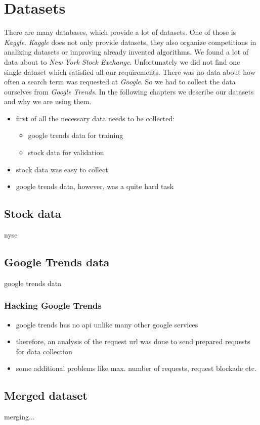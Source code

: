 \section{Datasets}
\label{sec:datasets}
There are many databases, which provide a lot of datasets. One of those is \textit{Kaggle}. \textit{Kaggle} does not only provide datasets, they also organize competitions in analizing datasets or improving already invented algorithms. We found a lot of data about to \textit{New York Stock Exchange}. Unfortunately we did not find one single dataset which satisfied all our requirements. There was no data about how often a search term was requested at \textit{Google}. So we had to collect the data ourselves from \textit{Google Trends}. In the following chapters we describe our datasets and why we are using them.

\begin{itemize}
	\item{first of all the necessary data needs to be collected: \\
		\begin{itemize}
			\item google trends data for training
			\item stock data for validation
		\end{itemize}
	}
	\item stock data was easy to collect
	\item google trends data, however, was a quite hard task
\end{itemize}

\subsection{Stock data}
\label{subsec:stockdata}
nyse


\subsection{Google Trends data}
\label{subsec:gtdata}
google trends data

\subsubsection{Hacking Google Trends}
\label{subsub:hackinggt}
\begin{itemize}
	\item google trends has no api unlike many other google services
	\item therefore, an analysis of the request url was done to send prepared requests for data collection
	\item some additional problems like max. number of requests, request blockade etc.
\end{itemize}


\subsection{Merged dataset}
\label{subsec:merged}
merging...